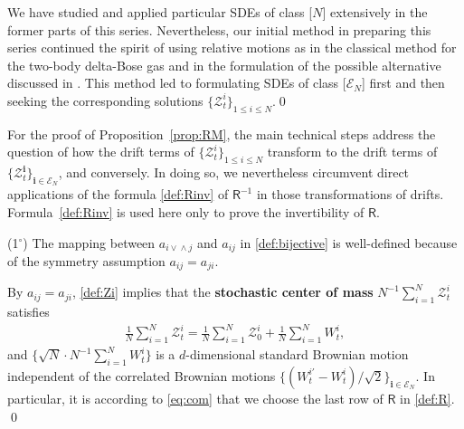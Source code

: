 \documentclass[12pt, twoside]{article}
\numberwithin{figure}{section}
\newcommand{\1}{\mathds 1}
\newcommand{\mc}{\mathcal}
\newcommand{\2}{{\mathbf 1}}
\newcommand{\cc}{{^\circ}}
\newcommand{\bi}{\mathbf i}
\newcommand{\two}{{\sqrt{2}}}
\begin{document}
\begin{rmk}\label{rmk:motivation}
We have studied and applied particular SDEs of class [$N$] extensively in the former parts of this series. Nevertheless, our initial method in preparing this series continued the spirit of using relative motions as in the classical method for the two-body delta-Bose gas and in the formulation of the possible alternative discussed in \cite[Section~2]{C:SDBG2-4}. This method led to formulating SDEs of class [$\mathcal E_N$] first and then seeking the corresponding solutions $\{\mathcal Z^i_t\}_{1\leq i\leq N}$.\qed 
\end{rmk}

For the proof of Proposition~\ref{prop:RM}, the main technical steps address the question of how the drift terms of $\{\mc Z^i_t\}_{1\leq i\leq N}$ transform to the drift terms of $\{\mc Z^\bi_t\}_{\bi\in \mc E_N}$, and conversely. In doing so, we nevertheless circumvent direct applications of the formula \eqref{def:Rinv} of $\mathsf R^{-1}$ in those transformations of drifts. Formula~\eqref{def:Rinv} is used here only to prove the invertibility of $\mathsf R$.

\begin{rmk}\label{rmk:com}
{\rm (1$\cc$)} The mapping between $a_{i\vee\!\wedge j}$ and $a_{ij}$ in \eqref{def:bijective} is well-defined because of the symmetry assumption $a_{ij}=a_{ji}$.\medskip 

\noindent {\rm (2$\cc$)} By $a_{ij}=a_{ji}$, \eqref{def:Zi} implies that the {\bf stochastic center of mass} $N^{-1}\sum_{i=1}^N \mc Z^i_t$ satisfies
\begin{align}\label{eq:com}
\frac{1}{N}\sum_{i=1}^N \mc Z^i_t=\frac{1}{N}\sum_{i=1}^N \mc Z^i_0+\frac{1}{N}\sum_{i=1}^NW^i_t,
\end{align}
and $\{\sqrt{N}\cdot N^{-1}\sum_{i=1}^NW^i_t \}$ is a $d$-dimensional standard Brownian motion independent of the correlated Brownian motions $\{(W^{i\prime}_t-W^i_t)/\two \}_{\bi\in \mc E_N}$. In particular, it is according to \eqref{eq:com} that we choose the last row of $\mathsf  R$ in \eqref{def:R}. 
\qed 
\end{rmk}
\end{document}
